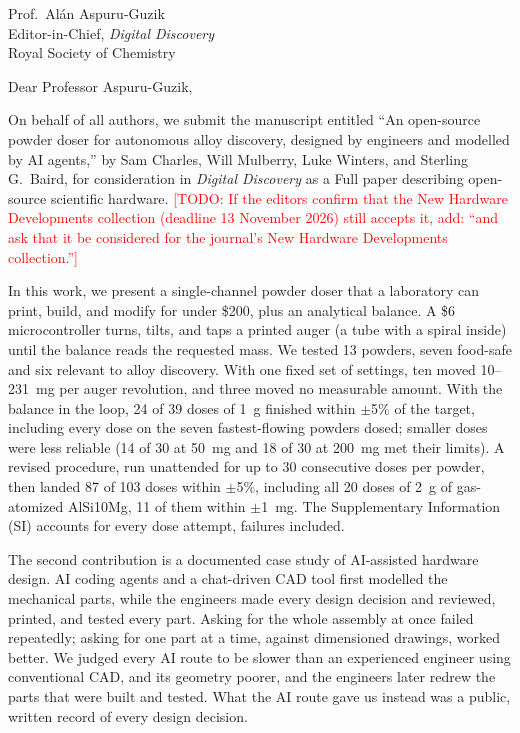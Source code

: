 \documentclass[11pt]{letter}
\newcommand{\TODO}[1]{\textcolor{red}{[TODO: #1]}}
\begin{document}
\begin{letter}{Prof.\ Al\'an Aspuru-Guzik\\
Editor-in-Chief, \textit{Digital Discovery}\\
Royal Society of Chemistry}

\opening{Dear Professor Aspuru-Guzik,}

On behalf of all authors, we submit the manuscript entitled ``An open-source powder doser for autonomous alloy discovery, designed by engineers and modelled by AI agents,'' by Sam Charles, Will Mulberry, Luke Winters, and Sterling G.\ Baird, for consideration in \textit{Digital Discovery} as a Full paper describing open-source scientific hardware. \TODO{If the editors confirm that the New Hardware Developments collection (deadline 13 November 2026) still accepts it, add: ``and ask that it be considered for the journal's New Hardware Developments collection.''}

In this work, we present a single-channel powder doser that a laboratory can print, build, and modify for under \$200, plus an analytical balance. A \$6 microcontroller turns, tilts, and taps a printed auger (a tube with a spiral inside) until the balance reads the requested mass. We tested 13 powders, seven food-safe and six relevant to alloy discovery. With one fixed set of settings, ten moved 10--231~mg per auger revolution, and three moved no measurable amount. With the balance in the loop, 24 of 39 doses of 1~g finished within $\pm$5\% of the target, including every dose on the seven fastest-flowing powders dosed; smaller doses were less reliable (14 of 30 at 50~mg and 18 of 30 at 200~mg met their limits). A revised procedure, run unattended for up to 30 consecutive doses per powder, then landed 87 of 103 doses within $\pm$5\%, including all 20 doses of 2~g of gas-atomized AlSi10Mg, 11 of them within $\pm$1~mg. The Supplementary Information (SI) accounts for every dose attempt, failures included.

The second contribution is a documented case study of AI-assisted hardware design. AI coding agents and a chat-driven CAD tool first modelled the mechanical parts, while the engineers made every design decision and reviewed, printed, and tested every part. Asking for the whole assembly at once failed repeatedly; asking for one part at a time, against dimensioned drawings, worked better. We judged every AI route to be slower than an experienced engineer using conventional CAD, and its geometry poorer, and the engineers later redrew the parts that were built and tested. What the AI route gave us instead was a public, written record of every design decision.


\end{letter}
\end{document}
